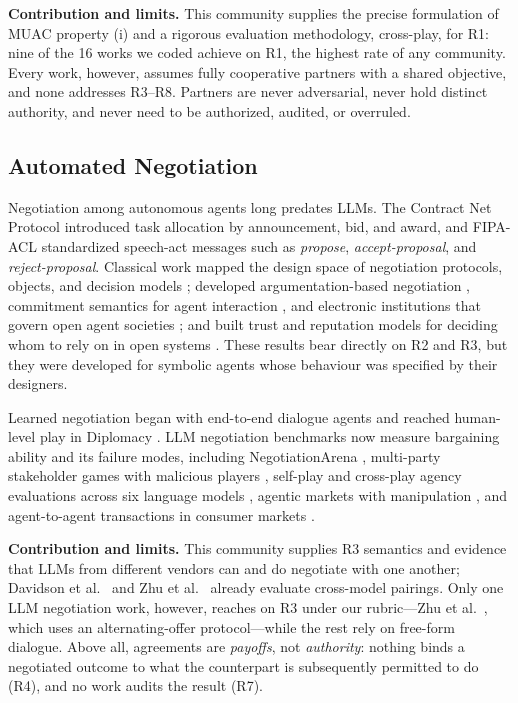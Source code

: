 \documentclass[conference]{IEEEtran}
\newcommand{\full}{{\small\CIRCLE}}
\begin{document}
\textbf{Contribution and limits.} This community supplies the precise formulation of MUAC property (i) and a rigorous evaluation methodology, cross-play, for R1: nine of the 16 works we coded achieve \full{} on R1, the highest rate of any community. Every work, however, assumes fully cooperative partners with a shared objective, and none addresses R3--R8. Partners are never adversarial, never hold distinct authority, and never need to be authorized, audited, or overruled.

\subsection{Automated Negotiation}\label{sec-6-2}

Negotiation among autonomous agents long predates LLMs. The Contract Net Protocol \cite{smith1980contractnet} introduced task allocation by announcement, bid, and award, and FIPA-ACL \cite{fipa2002acl} standardized speech-act messages such as \emph{propose}, \emph{accept-proposal}, and \emph{reject-proposal}. Classical work mapped the design space of negotiation protocols, objects, and decision models \cite{jennings2001automated}; developed argumentation-based negotiation \cite{rahwan2003abn}, commitment semantics for agent interaction \cite{singh1998acl, singh1999commitments, yolum2002flexible}, and electronic institutions that govern open agent societies \cite{esteva2001electronic}; and built trust and reputation models for deciding whom to rely on in open systems \cite{ramchurn2004trust, sabater2005review, huynh2006fire, pinyol2013trust}. These results bear directly on R2 and R3, but they were developed for symbolic agents whose behaviour was specified by their designers.

Learned negotiation began with end-to-end dialogue agents \cite{lewis2017dealnodeal} and reached human-level play in Diplomacy \cite{fair2022cicero}. LLM negotiation benchmarks now measure bargaining ability and its failure modes, including NegotiationArena \cite{bianchi2024negotiationarena}, multi-party stakeholder games with malicious players \cite{abdelnabi2024stakeholders}, self-play and cross-play agency evaluations across six language models \cite{davidson2024agency}, agentic markets with manipulation \cite{bansal2025marketplace}, and agent-to-agent transactions in consumer markets \cite{zhu2025riskygame}.

\textbf{Contribution and limits.} This community supplies R3 semantics and evidence that LLMs from different vendors can and do negotiate with one another; Davidson et al.~\cite{davidson2024agency} and Zhu et al.~\cite{zhu2025riskygame} already evaluate cross-model pairings. Only one LLM negotiation work, however, reaches \full{} on R3 under our rubric---Zhu et al.~\cite{zhu2025riskygame}, which uses an alternating-offer protocol---while the rest rely on free-form dialogue. Above all, agreements are \emph{payoffs}, not \emph{authority}: nothing binds a negotiated outcome to what the counterpart is subsequently permitted to do (R4), and no work audits the result (R7).
\end{document}
